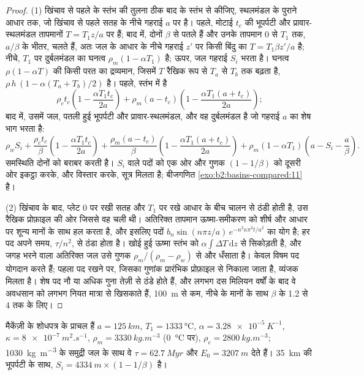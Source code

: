 \begin{proof}
(1) खिंचाव से पहले के स्तंभ की तुलना ठीक बाद के स्तंभ से कीजिए, स्थलमंडल के पुराने आधार तक,
जो खिंचाव से पहले सतह के नीचे गहराई $a$ पर है। पहले, मोटाई $t_c$ की भूपर्पटी
और प्रावार-स्थलमंडल तापमानों $T = T_1 z/a$ पर हैं; बाद में, दोनों
$\beta$ से पतले हैं और उनके तापमान $0$ से $T_1$ तक, $a/\beta$ के भीतर, चलते हैं, अतः जल के आधार के नीचे गहराई $z'$ पर
किसी बिंदु का $T = T_1\beta z'/a$ है; नीचे, $T_1$ पर दुर्बलमंडल का
घनत्व $\rho_m(1 - \alpha T_1)$ है; ऊपर, जल गहराई $S_i$ भरता है। घनत्व $\rho(1 - \alpha T)$ की
किसी परत का द्रव्यमान, जिसमें $T$ रैखिक रूप से $T_a$ से $T_b$ तक बढ़ता है,
$\rho\,h\,(1 - \alpha(T_a + T_b)/2)$ है। पहले, स्तंभ में है
\[
  \rho_c t_c\left(1 - \frac{\alpha T_1 t_c}{2a}\right)
  + \rho_m (a - t_c)\left(1 - \frac{\alpha T_1 (a + t_c)}{2a}\right);
\]
बाद में, उसमें जल, पतली हुई भूपर्पटी और प्रावार-स्थलमंडल, और वह दुर्बलमंडल है जो
गहराई $a$ का शेष भाग भरता है:
\[
  \rho_w S_i + \frac{\rho_c t_c}{\beta}\left(1 - \frac{\alpha T_1 t_c}{2a}\right)
  + \frac{\rho_m (a - t_c)}{\beta}\left(1 - \frac{\alpha T_1 (a + t_c)}{2a}\right)
  + \rho_m(1 - \alpha T_1)\left(a - S_i - \frac{a}{\beta}\right).
\]
समस्थिति दोनों को बराबर करती है। $S_i$ वाले पदों को एक ओर और गुणक
$(1 - 1/\beta)$ को दूसरी ओर इकट्ठा करके, और विस्तार करके, सूत्र मिलता है; बीजगणित
\cref{exo:b2:basins-compared:11} है।

(2) खिंचाव के बाद, प्लेट $0$ पर रखी सतह और $T_1$ पर रखे आधार के बीच चालन से ठंडी होती है,
उस रैखिक प्रोफ़ाइल की ओर जिससे वह चली थी। अतिरिक्त तापमान ऊष्मा-समीकरण को
शीर्ष और आधार पर शून्य मानों के साथ हल करता है, और इसलिए पदों
$b_n\sin(n\pi z/a)\,e^{-n^2\kappa\pi^2 t/a^2}$ का योग है; हर पद अपने समय, $\tau/n^2$, से ठंडा होता है।
खोई हुई ऊष्मा स्तंभ को $\alpha\int \Delta T\,\mathrm{d}z$ से सिकोड़ती है, और जगह भरने वाला अतिरिक्त
जल उसे गुणक $\rho_m/(\rho_m - \rho_w)$ से और धँसाता है। केवल विषम पद
योगदान करते हैं; पहला पद रखने पर, जिसका गुणांक प्रारंभिक प्रोफ़ाइल से निकाला जाता है,
व्यंजक मिलता है। शेष पद नौ या अधिक गुना तेज़ी से ठंडे होते हैं, और लगभग दस मिलियन वर्षों के बाद
वे अवधसान को लगभग नियत मात्रा से खिसकाते हैं, \qty{100}{m} से कम, नीचे के मानों के साथ $\beta$ के
1.2 से 4 तक के लिए।
\end{proof}

मैकेंज़ी के शोधपत्र के प्राचल हैं $a = \qty{125}{km}$, $T_1 = \qty{1333}{\celsius}$,
$\alpha = \qty{3.28e-5}{K^{-1}}$, $\kappa = \qty{8e-7}{m^2.s^{-1}}$, $\rho_m =
\qty{3330}{kg.m^{-3}}$ (\qty{0}{\celsius} पर), $\rho_c = \qty{2800}{kg.m^{-3}}$; \qty{1030}{kg.m^{-3}}
के समुद्री जल के साथ वे $\tau = \qty{62.7}{Myr}$ और $E_0 = \qty{3207}{m}$ देते हैं। \qty{35}{km} की
भूपर्पटी के साथ,  $S_i = \qty{4334}{m} \times (1 - 1/\beta)$ है।

